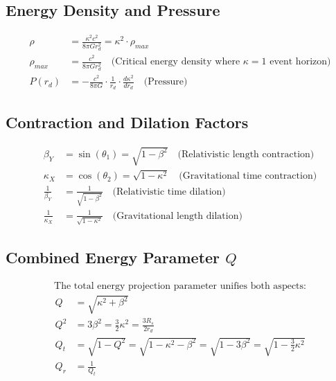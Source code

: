 \documentclass[12pt, a4paper]{article}
\begin{document}
\subsection{Energy Density and Pressure}

\begin{align}
    \rho &= \frac{\kappa^2 c^2}{8\pi G r_{d}^2} = \kappa^2 \cdot \rho_{max} \\
    \rho_{max} &= \frac{c^2}{8\pi G r_{d}^2} \quad \text{(Critical energy density where $\kappa=1$ event horizon)} \\
    P(r_{d}) &= - \frac{c^2}{8\pi G} \cdot \frac{1}{r_{d}} \cdot \frac{d\kappa^2}{dr_{d}} \quad \text{(Pressure)}
\end{align}

\subsection{Contraction and Dilation Factors}

\begin{align}
    \beta_Y &= \sin\left(\theta_1\right) = \sqrt{1 - \beta^2} \quad \text{(Relativistic length contraction)} \\
    \kappa_X &= \cos\left(\theta_2\right) = \sqrt{1 - \kappa^2} \quad \text{(Gravitational time contraction)} \\
      \frac{1}{\beta_Y} &= \frac{1}{\sqrt{1-\beta^2}} \quad \text{(Relativistic time dilation)} \\
    \frac{1}{\kappa_X} &= \frac{1}{\sqrt{1-\kappa^2}} \quad \text{(Gravitational length dilation)}
\end{align}

\subsection{Combined Energy Parameter $Q$}

\begin{align}
\text{The total energy projection parameter unifies both aspects:}
\end{align}
\begin{align}
    Q &=\sqrt{\kappa^2 + \beta^2}  \\
    Q^{2}&= 3\beta^2 = \frac{3}{2}\kappa^2 = \frac{3R_s}{2r_{d}} \\
    Q_t &= \sqrt{1-Q^2} = \sqrt{1-\kappa^2-\beta^2} = \sqrt{1-3\beta^2} = \sqrt{1-\frac{3}{2}\kappa^2} \\
    Q_r &= \frac{1}{Q_t}
\end{align}
\end{document}
